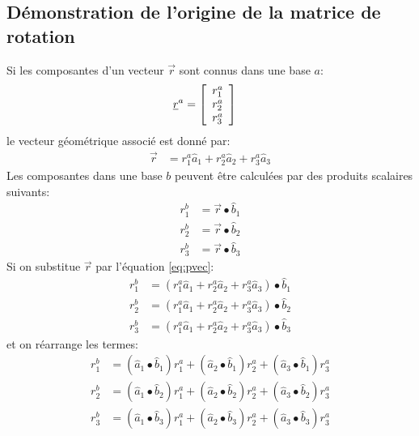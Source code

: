 \subsection{Démonstration de l'origine de la matrice de rotation}
Si les composantes d'un vecteur $\vec{r}$ sont connus dans une base $a$:
\begin{align}
\underline{r}^a &= \left[ \begin{array}{c} r_1^a \\ r_2^a \\ r_3^a  \end{array} \right]
\end{align} 
le vecteur géométrique associé est donné par:
\begin{align}
\vec{r} &= r_1^a \hat{a}_1 + r_2^a \hat{a}_2 + r_3^a \hat{a}_3
\label{eq:pvec}
\end{align} 
Les composantes dans une base $b$ peuvent être calculées par des produits scalaires suivants:
\begin{align}
r_1^b &= \vec{r} \bullet \hat{b}_1 \\
r_2^b &= \vec{r} \bullet \hat{b}_2 \\
r_3^b &= \vec{r} \bullet \hat{b}_3
\end{align} 
Si on substitue $\vec{r}$ par l'équation \eqref{eq:pvec}:
\begin{align}
r_1^b &= (r_1^a \hat{a}_1 + r_2^a \hat{a}_2 + r_3^a \hat{a}_3) \bullet \hat{b}_1 \\
r_2^b &= (r_1^a \hat{a}_1 + r_2^a \hat{a}_2 + r_3^a \hat{a}_3) \bullet \hat{b}_2 \\
r_3^b &= (r_1^a \hat{a}_1 + r_2^a \hat{a}_2 + r_3^a \hat{a}_3) \bullet \hat{b}_3
\end{align} 
et on réarrange les termes:
\begin{align}
r_1^b &= (\hat{a}_1 \bullet \hat{b}_1 ) r_1^a + (\hat{a}_2 \bullet \hat{b}_1 ) r_2^a + (\hat{a}_3 \bullet \hat{b}_1 ) r_3^a \\
r_2^b &= (\hat{a}_1 \bullet \hat{b}_2 ) r_1^a + (\hat{a}_2 \bullet \hat{b}_2 ) r_2^a + (\hat{a}_3 \bullet \hat{b}_2 ) r_3^a \\
r_3^b &= (\hat{a}_1 \bullet \hat{b}_3 ) r_1^a + (\hat{a}_2 \bullet \hat{b}_3 ) r_2^a + (\hat{a}_3 \bullet \hat{b}_3 ) r_3^a 
\end{align} 
